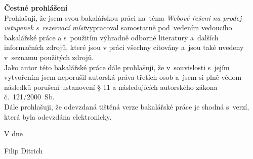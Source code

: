\newpage
\pagestyle{empty}

\noindent
{\large\bfseries Čestné prohlášení}\\

\noindent
Prohlašuji, že jsem svou bakalářskou práci na~téma \textit{Webové řešení na prodej vstupenek s~rezervací míst}vypracoval samostatně pod~vedením vedoucího bakalářské práce a s~použitím výhradně odborné literatury a~dalších informačních zdrojů, které jsou v práci všechny citovány a~jsou také uvedeny v~seznamu použitých zdrojů.\\

\noindent
Jako autor této bakalářské práce dále prohlašuji, že v~souvislosti s~jejím vytvořením jsem neporušil autorská práva třetích osob a~jsem si plně vědom následků porušení ustanovení § 11 a následujících autorského zákona č.~121/2000~Sb.\\

\noindent
Dále prohlašuji, že odevzdaná tištěná verze bakalářské práce je shodná s~verzí, která byla odevzdána elektronicky.

\vspace{18mm}
\noindent
V \makebox[4cm]{\dotfill} dne \makebox[2.5cm]{\dotfill}
\hspace*{\fill}
\makebox[4cm]{\dotfill}

\begin{flushright}
    \noindent
    Filip Ditrich
\end{flushright}
